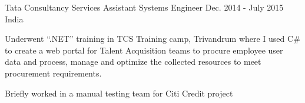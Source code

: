 \begin{cventries}
  \cventry
    {Tata Consultancy Services} %
    {Assistant Systems Engineer} %
    {Dec. 2014 - July 2015} %
    {India} %
    {
      \begin{cvitems} %
        \item {Underwent “.NET” training in TCS Training camp, Trivandrum where I used C# to create a web portal for Talent Acquisition teams to procure employee user data and process, manage and optimize the collected resources to meet procurement requirements.}
        \item {Briefly worked in a manual testing team for Citi Credit project}
      \end{cvitems}
    }


\end{cventries}
